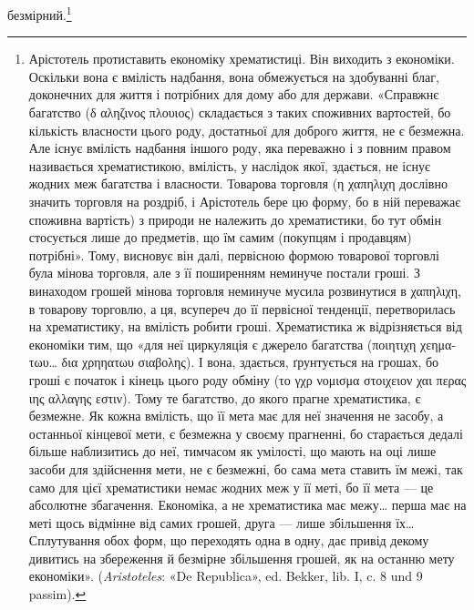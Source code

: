 безмірний.\footnote{
Арістотель протиставить економіку хрематистиці. Він виходить
з економіки. Оскільки вона є вмілість надбання, вона обмежується на здобуванні
благ, доконечних для життя і потрібних для дому або для держави.
«Справжнє багатство (\textgreek{δ αληζινος πλουιος}) складається з таких споживних
вартостей, бо кількість власности цього роду, достатньої для
доброго життя, не є безмежна. Але існує вмілість надбання іншого роду,
яка переважно і з повним правом називається хрематистикою, вмілість,
у наслідок якої, здається, не існує жодних меж багатства і власности.
Товарова торговля (\textgreek{η χαπηλιχη} дослівно значить торговля на роздріб,
і Арістотель бере цю форму, бо в ній переважає споживна вартість) з природи
не належить до хрематистики, бо тут обмін стосується лише до предметів,
що їм самим (покупцям і продавцям) потрібні». Тому, висновує
він далі, первісною формою товарової торговлі була мінова торговля,
але з її поширенням неминуче постали гроші. З винаходом грошей мінова
торговля неминуче мусила розвинутися в \textgreek{χαπηλιχη}, в товарову торговлю,
а ця, всупереч до її первісної тенденції, перетворилась на хрематистику,
на вмілість робити гроші. Хрематистика ж відрізняється від економіки
тим, що «для неї циркуляція є джерело багатства (\textgreek{ποιητιχη χεηματωυ\dots{} δια χρηηατωυ σιαβολης}). І
вона, здається, ґрунтується на грошах, бо гроші є початок і кінець цього роду обміну (\textgreek{το γχρ νομισμα
στοιχειον χαι περας ιης αλλαγης εστιν}). Тому те багатство, до якого прагне хрематистика, є
безмежне. Як кожна вмілість, що її мета має для неї значення не засобу,
а останньої кінцевої мети, є безмежна у своєму прагненні, бо старається
дедалі більше наблизитись до неї, тимчасом як умілості, що мають на оці
лише засоби для здійснення мети, не є безмежні, бо сама мета ставить їм
межі, так само для цієї хрематистики немає жодних меж у її меті, бо її
мета — це абсолютне збагачення. Економіка, а не хрематистика має
межу\dots{} перша має на меті щось відмінне від самих грошей, друга — лише
збільшення їх\dots{} Сплутування обох форм, що переходять одна в одну, дає
привід декому дивитись на збереження й безмірне збільшення грошей,
як на останню мету економіки». (\emph{Aristoteles}: «De Republica», ed. Bekker,
lib. I, c. 8 und 9 passim).
}

